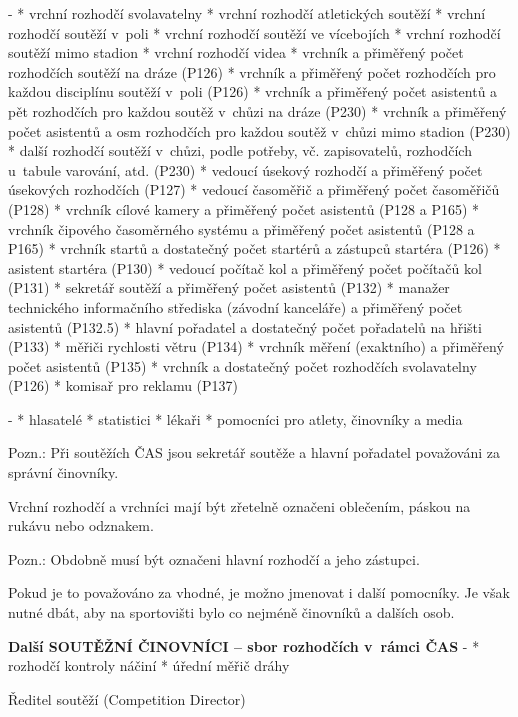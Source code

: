 \begitems \style -
* vrchní rozhodčí svolavatelny
* vrchní rozhodčí atletických soutěží
* vrchní rozhodčí soutěží v~poli
* vrchní rozhodčí soutěží ve vícebojích
* vrchní rozhodčí soutěží mimo stadion
* vrchní rozhodčí videa
* vrchník a přiměřený počet rozhodčích soutěží na dráze (P126)
* vrchník a přiměřený počet rozhodčích pro každou disciplínu soutěží v~poli (P126)
* vrchník a přiměřený počet asistentů a pět rozhodčích pro každou soutěž v~chůzi na dráze (P230)
* vrchník a přiměřený počet asistentů a osm rozhodčích pro každou soutěž v~chůzi mimo stadion (P230)
* další rozhodčí soutěží v~chůzi, podle potřeby, vč. zapisovatelů, rozhodčích u~tabule varování, atd. (P230)
* vedoucí úsekový rozhodčí a přiměřený počet úsekových rozhodčích (P127)
* vedoucí časoměřič a přiměřený počet časoměřičů (P128)
* vrchník cílové kamery a přiměřený počet asistentů (P128 a P165)
* vrchník čipového časoměrného systému a přiměřený počet asistentů (P128 a P165)
* vrchník startů a dostatečný počet startérů a zástupců startéra (P126)
* asistent startéra (P130)
* vedoucí počítač kol a přiměřený počet počítačů kol (P131)
* sekretář soutěží a přiměřený počet asistentů (P132)
* manažer technického informačního střediska (závodní kanceláře) a přiměřený počet asistentů (P132.5)
* hlavní pořadatel a dostatečný počet pořadatelů na hřišti (P133)
* měřiči rychlosti větru (P134)
* vrchník měření (exaktního) a přiměřený počet asistentů (P135)
* vrchník a dostatečný počet rozhodčích svolavatelny (P126)
* komisař pro reklamu (P137)
\enditems

\begitems \style -
* hlasatelé
* statistici
* lékaři
* pomocníci pro atlety, činovníky a media
\enditems

Pozn.: Při soutěžích ČAS jsou sekretář soutěže a hlavní pořadatel považováni za správní činovníky.

Vrchní rozhodčí a vrchníci mají být zřetelně označeni oblečením, páskou na rukávu nebo odznakem.

Pozn.: Obdobně musí být označeni hlavní rozhodčí a jeho zástupci.

Pokud je to považováno za vhodné, je možno jmenovat i další pomocníky. Je však nutné dbát, aby na sportovišti bylo co nejméně činovníků a dalších osob.

{\bf Další SOUTĚŽNÍ ČINOVNÍCI -- sbor rozhodčích v~rámci ČAS}
\begitems \style -
* rozhodčí kontroly náčiní
* úřední měřič dráhy
\enditems

\secc Ředitel soutěží (Competition Director)


